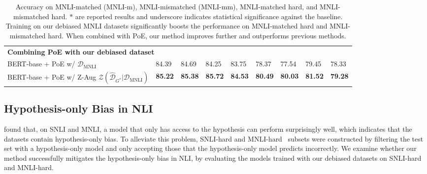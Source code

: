 \begin{table*}[bt]
\begin{center}
{\begin{tabular}{lllllllll}
      \midrule
      \multicolumn{9}{l}{\bf{Combining PoE with our debiased dataset}} \\
      BERT-base + PoE w/ $\mathcal{D}_{\text{MNLI}}$ & 84.39 & 84.69 & 84.25 & 83.75 & 78.37 & 77.54 & 79.45 & 78.33 \\
      BERT-base + PoE w/ Z-Aug $\mathcal{Z}(\hat{\mathcal{D}}_{G^*} | \mathcal{D}_{\text{MNLI}})$ & \textbf{85.22} & \textbf{85.38} & \textbf{85.72}& \textbf{84.53} & \textbf{80.49} & \textbf{80.03} & \textbf{81.52} & \textbf{79.28} \\
      \bottomrule
    \end{tabular}
}
\caption{Accuracy on MNLI-matched (MNLI-m), MNLI-mismatched (MNLI-mm), MNLI-matched hard, and MNLI-mismatched hard. $*$ are reported results and underscore indicates statistical significance against the baseline.
Training on our debiased MNLI datasets significantly boosts the performance on MNLI-matched hard and MNLI-mismatched hard. When combined with PoE, our method improves further and outperforms previous methods.
} \label{tab:mnli-results}
\end{center}
\end{table*}



\subsection{Hypothesis-only Bias in NLI} \label{sec:nli-hard}

\citet{GururanganSLSBS18} found that, on SNLI and MNLI, a model that only has access to the hypothesis can perform surprisingly well, which indicates that the datasets contain hypothesis-only bias.
To alleviate this problem, SNLI-hard and MNLI-hard~\citep{GururanganSLSBS18} subsets were constructed by filtering the test set with a hypothesis-only model and only accepting those that the hypothesis-only model predicts incorrectly.
We examine whether our method successfully mitigates the hypothesis-only bias in NLI, by evaluating the models trained with our debiased datasets on SNLI-hard and MNLI-hard.


